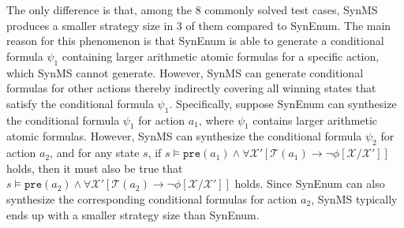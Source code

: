 \documentclass[review]{elsarticle}
\newcommand{\statevar}{\mathcal{X}}
\newcommand{\trans}{\mathcal{T}}
\newcommand{\pre}{\mathtt{pre}}
\begin{document}
The only difference is that, among the $8$ commonly solved test cases, SynMS produces a smaller strategy size in $3$ of them compared to SynEnum. The main reason for this phenomenon is that SynEnum is able to generate a conditional formula $\psi_1$ containing larger arithmetic atomic formulas for a specific action, which SynMS cannot generate. However, SynMS can generate conditional formulas for other actions thereby indirectly covering all winning states that satisfy the conditional formula $\psi_1$. Specifically, suppose SynEnum can synthesize the conditional formula $\psi_1$ for action $a_1$, where $\psi_1$ contains larger arithmetic atomic formulas. However, SynMS can synthesize the conditional formula $\psi_2$ for action $a_2$, and for any state $s$, if $s \models \pre(a_1) \land \forall \statevar' [\trans(a_1) \rightarrow \neg \phi[\statevar/\statevar']]$ holds, then it must also be true that $s \models \pre(a_2) \land \forall \statevar' [\trans(a_2) \rightarrow \neg \phi[\statevar/\statevar']]$ holds. Since SynEnum can also synthesize the corresponding conditional formulas for action $a_2$, SynMS typically ends up with a smaller strategy size than SynEnum.
\end{document}
